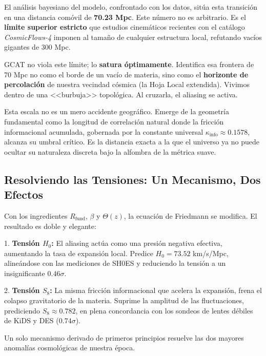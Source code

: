 \documentclass[12pt, a4paper]{article}
\begin{document}
El análisis bayesiano del modelo, confrontado con los datos, sitúa esta transición en una distancia comóvil de \textbf{70.23 Mpc}. Este número no es arbitrario. Es el \textbf{límite superior estricto} que estudios cinemáticos recientes con el catálogo \textit{CosmicFlows-4} imponen al tamaño de cualquier estructura local, refutando vacíos gigantes de 300 Mpc.

GCAT no viola este límite; lo \textbf{satura óptimamente}. Identifica esa frontera de 70 Mpc no como el borde de un vacío de materia, sino como el \textbf{horizonte de percolación} de nuestra vecindad cósmica (la Hoja Local extendida). Vivimos dentro de una <<burbuja>> topológica. Al cruzarla, el aliasing se activa.

Esta escala no es un mero accidente geográfico. Emerge de la geometría fundamental como la longitud de correlación natural donde la fricción informacional acumulada, gobernada por la constante universal $\kappa_{\text{info}} \approx 0.1578$, alcanza su umbral crítico. Es la distancia exacta a la que el universo ya no puede ocultar su naturaleza discreta bajo la alfombra de la métrica suave.

\subsection{Resolviendo las Tensiones: Un Mecanismo, Dos Efectos}

Con los ingredientes $R_{\text{fund}}$, $\beta$ y $\Theta(z)$, la ecuación de Friedmann se modifica. El resultado es doble y elegante:

1.  \textbf{Tensión $H_0$:} El aliasing actúa como una presión negativa efectiva, aumentando la tasa de expansión local. Predice $H_0 = 73.52$ km/s/Mpc, alineándose con las mediciones de SH0ES y reduciendo la tensión a un insignificante $0.46\sigma$.

2.  \textbf{Tensión $S_8$:} La misma fricción informacional que acelera la expansión, frena el colapso gravitatorio de la materia. Suprime la amplitud de las fluctuaciones, prediciendo $S_8 \approx 0.782$, en plena concordancia con los sondeos de lentes débiles de KiDS y DES ($0.74\sigma$).

Un solo mecanismo derivado de primeros principios resuelve las dos mayores anomalías cosmológicas de nuestra época.

\end{document}
